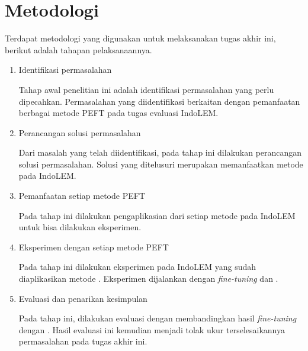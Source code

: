 \section{Metodologi}

Terdapat metodologi yang digunakan untuk melaksanakan tugas akhir ini, berikut adalah tahapan pelaksanaannya.

\begin{enumerate}
    \item Identifikasi permasalahan

    Tahap awal penelitian ini adalah identifikasi permasalahan yang perlu dipecahkan. Permasalahan yang diidentifikasi berkaitan dengan pemanfaatan berbagai metode PEFT pada tugas evaluasi IndoLEM.

    \item Perancangan solusi permasalahan

    Dari masalah yang telah diidentifikasi, pada tahap ini dilakukan perancangan solusi permasalahan. Solusi yang ditelusuri merupakan memanfaatkan metode \PEFT pada IndoLEM.

    \item Pemanfaatan setiap metode PEFT

    Pada tahap ini dilakukan pengaplikasian dari setiap metode \PEFT pada IndoLEM untuk bisa dilakukan eksperimen.

    \item Eksperimen dengan setiap metode PEFT

    Pada tahap ini dilakukan eksperimen pada IndoLEM yang sudah diaplikasikan metode \PEFT. Eksperimen  dijalankan dengan \textit{fine-tuning}  dan \PEFT.

    \item Evaluasi dan penarikan kesimpulan

    Pada tahap ini, dilakukan evaluasi dengan membandingkan hasil \textit{fine-tuning}  dengan \PEFT. Hasil evaluasi ini kemudian  menjadi tolak ukur terselesaikannya permasalahan pada tugas akhir ini.

\end{enumerate}
